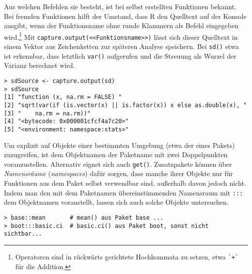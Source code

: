 Aus welchen Befehlen sie besteht, ist bei selbst erstellten Funktionen bekannt. Bei fremden Funktionen hilft der Umstand, dass R den Quelltext auf der Konsole ausgibt, wenn der Funktionsname ohne runde Klammern als Befehl eingegeben wird.\footnote{Operatoren sind in rückwärts gerichtete Hochkommata zu setzen, etwa \lstinline!`+`! für die Addition.} Mit \lstinline!capture.output(<<Funktionsname>>)! lässt sich dieser Quelltext in einem Vektor aus Zeichenketten zur späteren Analyse speichern. Bei \lstinline!sd()! etwa ist erkennbar, dass letztlich \lstinline!var()! aufgerufen und die Streuung als Wurzel der Varianz berechnet wird.
\begin{lstlisting}
> sdSource <- capture.output(sd)
> sdSource
[1] "function (x, na.rm = FALSE) "                                    
[2] "sqrt(var(if (is.vector(x) || is.factor(x)) x else as.double(x), "
[3] "    na.rm = na.rm))"                                             
[4] "<bytecode: 0x000001cfcf4a7c20>"                                  
[5] "<environment: namespace:stats>"
\end{lstlisting}

Um explizit auf Objekte einer bestimmten Umgebung (etwa der eines Pakets) zuzugreifen, ist dem Objektnamen der Paketname mit zwei Doppelpunkten voranzustellen. Alternativ eignet sich auch \lstinline!get()!. Zusatzpakete können über \emph{Namensräume} (\emph{namespaces}) dafür sorgen, dass manche ihrer Objekte nur für Funktionen aus dem Paket selbst verwendbar sind, außerhalb davon jedoch nicht. Indem man den mit dem Paketnamen übereinstimmenden Namensraum mit \lstinline!:::! dem Objektnamen voranstellt, lassen sich auch solche Objekte untersuchen.
\begin{lstlisting}
> base::mean       # mean() aus Paket base ...
> boot:::basic.ci  # basic.ci() aus Paket boot, sonst nicht sichtbar...
\end{lstlisting}

